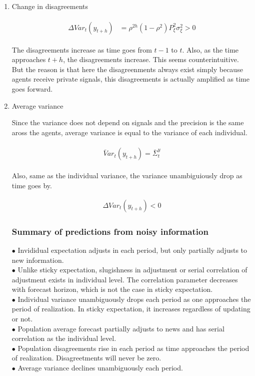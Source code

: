 \documentclass[]{article}
\begin{document}
\begin{enumerate}
\item Change in disagreements


\begin{eqnarray}
\begin{aligned}
\Delta Var_t(y_{t+h}) & = \rho^{2h}(1-\rho^2) P^2_\xi \sigma^2_\xi >0
\end{aligned}
\end{eqnarray}

The disagreements increase as time goes from $t-1$ to $t$. Also, as the time approaches $t+h$, the disagreements increase. This seems counterintuitive. But the reason is that here the disagreenments always exist simply because agents receive private signals, this disagreements is actually amplified as time goes forward. 

\item Average variance

Since the variance does not depend on signals and the precision is the same aross the agents, average variance is equal to the variance of each individual. 

\begin{eqnarray}
\begin{aligned}
\bar Var_t (y_{t+h}) = \bar \Sigma^y_t
\end{aligned}
\end{eqnarray}

Also, same as the individual variance, the variance unambiguiously drop as time goes by. 

\begin{eqnarray}
\Delta Var_t(y_{t+h}) < 0 
\end{eqnarray}

\subsubsection{Summary of predictions from noisy information}

$\bullet$  Invididual expectation adjusts in each period, but only partially adjusts to new information. \\
$\bullet$ Unlike sticky expectation, slugishness in adjustment or serial correlation of adjustment exists in individual level. The correlation parameter decreases with forecast horizon, which is not the case in sticky expectation.\\
$\bullet$  Individual variance unambiguously drops each period as one approaches the period of realization. In sticky expectation, it increases regardless of updating or not. \\ 
$\bullet$  Population average forecast partially adjusts to news and has serial correlation as the individual level. \\
$\bullet$  Population disagreements rise in each period as time approaches the period of realization. Disagreetments will never be zero. \\
$\bullet$  Average variance declines unambiguously each period. 
\end{enumerate}
\end{document}
